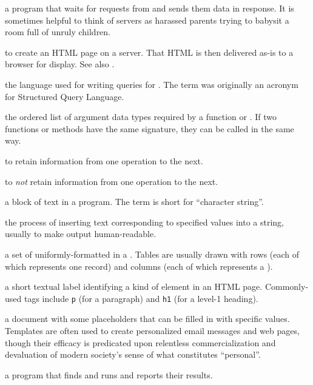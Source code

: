 \begin{description}
a program that waits for requests from  and sends them
data in response. It is sometimes helpful to think of servers as harassed
parents trying to babysit a room full of unruly children.

to create an HTML page on a server. That HTML is then delivered as-is to a
browser for display. See also .

the language used for writing queries for . The term was originally an acronym for
Structured Query Language.

the ordered list of argument data types required by a function or
. If two functions or methods have the same signature,
they can be called in the same way.

to retain information from one operation to the next.

to \emph{not} retain information from one operation to the next.

a block of text in a program. The term is short for ``character string''.

the process of inserting text corresponding to specified values into a string,
usually to make output human-readable.

a set of uniformly-formatted  in a . Tables are usually drawn with rows (each
of which represents one record) and columns (each of which represents a
).

a short textual label identifying a kind of element in an HTML page.
Commonly-used tags include \texttt{p} (for a paragraph) and \texttt{h1} (for a level-1
heading).

a document with some placeholders that can be filled in with specific values.
Templates are often used to create personalized email messages and web pages,
though their efficacy is predicated upon relentless commercialization and
devaluation of modern society's sense of what constitutes ``personal''.

a program that finds and runs  and reports their
results.


\end{description}
